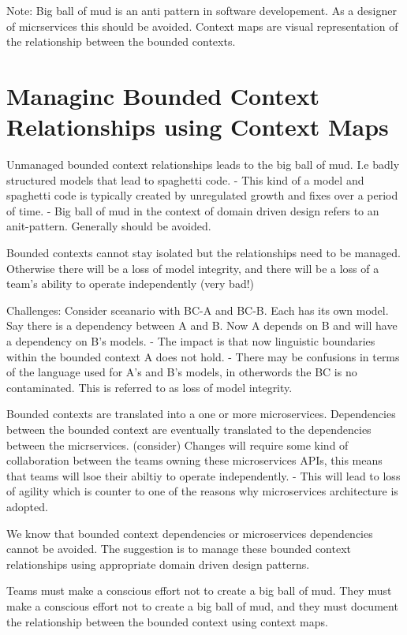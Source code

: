 Note:
Big ball of mud is an anti pattern in software developement. As a designer of micrservices this should be avoided.
Context maps are visual representation of the relationship between the bounded contexts.

\section{Managinc Bounded Context Relationships using Context Maps}
Unmanaged bounded context relationships leads to the big ball of mud. I.e badly structured models that lead to spaghetti code.
- This kind of a model and spaghetti code is typically created by unregulated growth and fixes over a period of time.
- Big ball of mud in the context of domain driven design refers to an anit-pattern. Generally should be avoided.

Bounded contexts cannot stay isolated but the relationships need to be managed.
Otherwise there will be a loss of model integrity, and there will be a loss of a team's ability to operate independently (very bad!)

Challenges:
Consider sceanario with BC-A and BC-B. Each has its own model.
Say there is a dependency between A and B. Now A depends on B and will have a dependency on B's models.
- The impact is that now linguistic boundaries within the bounded context A does not hold.
- There may be confusions in terms of the language used for A's and B's models, in otherwords the BC is no contaminated. This is referred to as loss of model integrity.

Bounded contexts are translated into a one or more microservices.
Dependencies between the bounded context are eventually translated to the dependencies between the micrservices. (consider)
Changes will require some kind of collaboration between the teams owning these microservices APIs, this means that teams will lsoe their abiltiy to operate independently.
- This will lead to loss of agility which is counter to one of the reasons why microservices architecture is adopted.

We know that bounded context dependencies or microservices dependencies cannot be avoided.
The suggestion is to manage these bounded context relationships using appropriate domain driven design patterns.

Teams must make a conscious effort not to create a big ball of mud.
They must make a conscious effort not to create a big ball of mud, and they must document the relationship between the bounded context using context maps.

